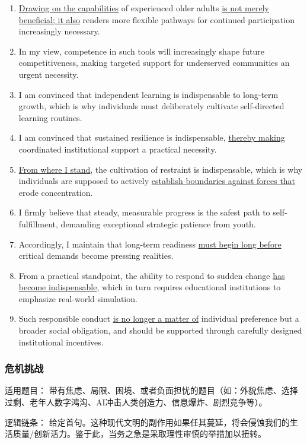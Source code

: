 \begin{enumerate}
    \item \underline{Drawing on the capabilities} of experienced older adults \underline{is not merely beneficial; it also} renders more flexible pathways for continued participation increasingly necessary.
    \item In my view, competence in such tools will increasingly shape future competitiveness, making targeted support for underserved communities an urgent necessity.
    \item I am convinced that independent learning is indispensable to long-term growth, which is why individuals must deliberately cultivate self-directed learning routines.
    \item I am convinced that sustained resilience is indispensable, \underline{thereby making} coordinated institutional support a practical necessity.
    \item \underline{From where I stand}, the cultivation of restraint is indispensable, which is why individuals are supposed to actively \underline{establish boundaries against forces that} erode concentration.
    \item I firmly believe that steady, measurable progress is the safest path to self-fulfillment, demanding exceptional strategic patience from youth. 
    \item Accordingly, I maintain that long-term readiness \underline{must begin long before} critical demands become pressing realities.
    \item From a practical standpoint, the ability to respond to sudden change \underline{has become indispensable}, which in turn requires educational institutions to emphasize real-world simulation.
    \item Such responsible conduct \underline{is no longer a matter of} individual preference but a broader social obligation, and should be supported through carefully designed institutional incentives.
\end{enumerate}

\subsubsection{危机挑战}

适用题目： 带有焦虑、局限、困境、或者负面担忧的题目（如：外貌焦虑、选择过剩、老年人数字鸿沟、AI冲击人类创造力、信息爆炸、剧烈竞争等）。

逻辑链条： 给定首句。这种现代文明的副作用如果任其蔓延，将会侵蚀我们的生活质量/创新活力。鉴于此，当务之急是采取理性审慎的举措加以扭转。

